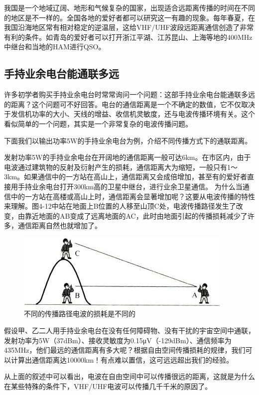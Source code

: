 \documentclass[12pt,UTF8]{ctexbook}
\begin{document}
我国是一个地域辽阔、地形和气候复杂的国家，出现适合远距离传播的时间在不同的地区是不一样的。全国各地的爱好者都可以研究这一有趣的现象。每年春夏，在我国沿海地区常有相对稳定的逆温层，这给VHF/UHF波段远距离通信创造了非常有利的条件。如青岛的爱好者可以打开浙江平湖、江苏昆山、上海等地的400MHz中继台和当地的HAM进行QSO。

\subsection{手持业余电台能通联多远}

许多初学者购买手持业余电台时常常询问一个问题：这部手持业余电台能通联多远的距离？这个问题可不好回答。电台的通信距离是一个不确定的数值，它不仅取决于发信机功率的大小、天线的增益、收信机灵敏度，还与电波传播环境有关。这个看似简单的一个问题，其实是一个非常复杂的电波传播问题。

下面我们以输出功率5W的手持业余电台为例，介绍不同传播方式下的通联距离。

发射功率5W的手持业余电台在开阔地的通信距离一般可达6km。在市区内，由于电波通过建筑物的反射及衍射产生的损耗，通信距离大为缩短，一般只有1～3km。如果通信中的一方站在高山上，通信距离又会成倍增加，甚至有的爱好者直接用手持业余电台打开300km高的卫星中继台，进行业余卫星通信。
为什么当通信中的一方站在高楼或高山上时，通信距离会显著增加呢？这要从电波传播的特性来理解。图4-12中站在地面上B位置的人移至山顶C处，电波传播路径发生了改变，由靠近地面的AB变成了远离地面的AC，此时由地面引起的传播损耗减少了许多，通信距离自然也就增加了。

\begin{figure}[htbp]
	\centering
	\includegraphics[width=0.7\linewidth]{55}
	\caption{不同的传播路径电波的损耗是不同的}
	\label{fig:1}
\end{figure}

假设甲、乙二人用手持业余电台在没有任何障碍物、没有干扰的宇宙空间中通联，发射功率为5W（37dBm）、接收灵敏度为0.15μV（-129dBm）、通信频率为435MHz，他们最远的通信距离有多大呢？根据自由空间传播损耗的规律，我们可以计算出通信距离达10000km！有点难以置信，这可远远超出我们的经验。

从上面的叙述中可以看出，电波在自由空间中可以传播很远的距离，这就是为什么在某些特殊的条件下，VHF/UHF电波可以传播几千千米的原因了。
\end{document}
